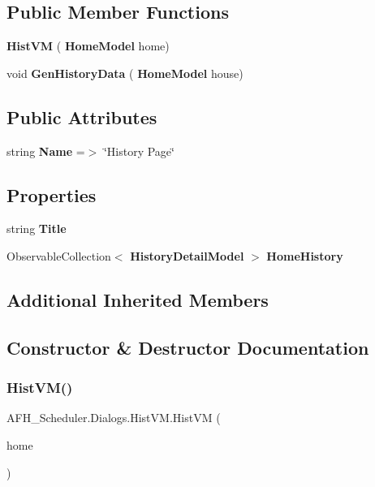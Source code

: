 \subsection*{Public Member Functions}
\begin{DoxyCompactItemize}
\item 
\textbf{ Hist\+VM} (\textbf{ Home\+Model} home)
\item 
void \textbf{ Gen\+History\+Data} (\textbf{ Home\+Model} house)
\end{DoxyCompactItemize}
\subsection*{Public Attributes}
\begin{DoxyCompactItemize}
\item 
string \textbf{ Name} =$>$ \char`\"{}History Page\char`\"{}
\end{DoxyCompactItemize}
\subsection*{Properties}
\begin{DoxyCompactItemize}
\item 
string \textbf{ Title}\hspace{0.3cm}{\ttfamily  [get, set]}
\item 
Observable\+Collection$<$ \textbf{ History\+Detail\+Model} $>$ \textbf{ Home\+History}\hspace{0.3cm}{\ttfamily  [get, set]}
\end{DoxyCompactItemize}
\subsection*{Additional Inherited Members}


\subsection{Constructor \& Destructor Documentation}
\mbox{\label{class_a_f_h___scheduler_1_1_dialogs_1_1_hist_v_m_a3a95b9fd299d0b3795437a46beb3a8d1}} 
\subsubsection{HistVM()}
{\footnotesize\ttfamily A\+F\+H\+\_\+\+Scheduler.\+Dialogs.\+Hist\+V\+M.\+Hist\+VM (\begin{DoxyParamCaption}\item[{\textbf{ Home\+Model}}]{home }\end{DoxyParamCaption})}



